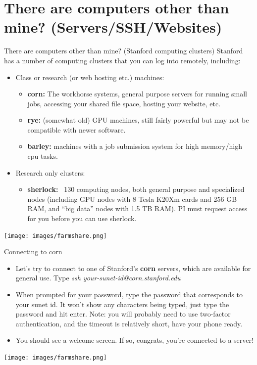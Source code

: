 \documentclass{beamer}
\begin{document}
\section{There are computers other than mine? (Servers/SSH/Websites)}
\begin{frame}{There are computers other than mine? (Stanford computing clusters)}
Stanford has a number of computing clusters that you can log into remotely, including:
\begin{itemize}
    \item Class or research (or web hosting etc.) machines:
    \begin{itemize}
	\item<1-> \textbf{corn:} The workhorse systems, general purpose servers for running small jobs, accessing your shared file space, hosting your website, etc.
	\item<2-> \textbf{rye:} (somewhat old) GPU machines, still fairly powerful but may not be compatible with newer software. 
	\item<3-> \textbf{barley:} machines with a job submission system for high memory/high cpu tasks.
    \end{itemize}
    \item<4-> Research only clusters:
    \begin{itemize}
	\item<4-> \textbf{sherlock:} ~130 computing nodes, both general purpose and specialized nodes (including GPU nodes with 8 Tesla K20Xm cards and 256 GB RAM, and ``big data'' nodes with 1.5 TB RAM). {\color{red} PI must request access for you before you can use sherlock.}
    \end{itemize}
\end{itemize}
\begin{center}\vspace{0em}\texttt{[image: images/farmshare.png]}\end{center}
\end{frame}

\begin{frame}{Connecting to corn}
\begin{itemize}
    \item<1-> Let's try to connect to one of Stanford's \textbf{corn} servers, which are available for general use. Type \emph{ssh your-sunet-id@corn.stanford.edu}
    \item<1-> When prompted for your password, type the password that corresponds to your sunet id. It won't show any characters being typed, just type the password and hit enter. Note: you will probably need to use two-factor authentication, and the timeout is relatively short, have your phone ready.
    \item<2-> You should see a welcome screen. If so, congrats, you're connected to a server!
\end{itemize}
\begin{center}\vspace{0em}\texttt{[image: images/farmshare.png]}\end{center}
\end{frame}
\end{document}
